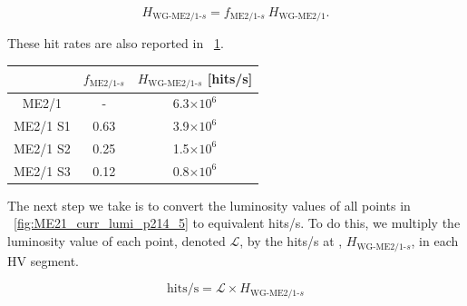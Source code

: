 \begin{equation}
	\label{eqn:ME21_HR_calc}
	H_{\text{WG-ME2/1-}s}=f_{\text{ME2/1-}s}  \  H_{\text{WG-ME2/1}}.
\end{equation}

These hit rates are also reported in \Tab~\ref{tab:21_hit_frac}. 

\begin{table}
	\centering
	\label{tab:21_hit_frac}
	\begin{tabular}{c|cc}
				& $f_{\text{ME2/1-}s}$    & $H_{\text{WG-ME2/1-}s}$ [hits/s]\\ \hline
	ME2/1       & -                       & 6.3$\times10^{6}$       \\ \hline
	ME2/1 S1    & 0.63                    & 3.9$\times10^{6}$       \\ \hline
	ME2/1 S2    & 0.25                    & 1.5$\times10^{6}$       \\ \hline
	ME2/1 S3    & 0.12                    & 0.8$\times10^{6}$       \\ 
	\end{tabular}
\end{table}

The next step we take is to convert the luminosity values of all points in \FigDot~\ref{fig:ME21_curr_lumi_p214_5} to equivalent \unit{hits/s}. To do this, we multiply the luminosity value of each point, denoted $\mathcal{L}$, by the \unit{hits/s} at , $H_{\text{WG-ME2/1-}s}$, in each HV segment.

\begin{equation}
	\label{eqn:lumi_to_hitrate}
	\text{hits/s} = \mathcal{L} \times H_{\text{WG-ME2/1-}s}
\end{equation}

